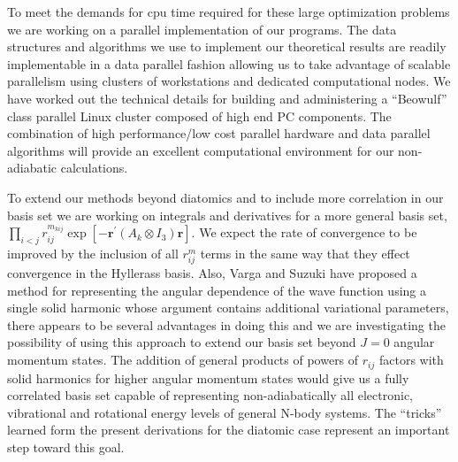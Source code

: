\documentclass[12pt]{article}
\begin{document}
To meet the demands for cpu time required for these large optimization
problems we are working on a parallel implementation of our programs. The data
structures and algorithms we use to implement our theoretical results are
readily implementable in a data parallel fashion allowing us to take advantage
of scalable parallelism using clusters of workstations and dedicated
computational nodes. We have worked out the technical details for building and
administering a ``Beowulf''\cite{beowulfwww} class parallel Linux cluster
composed of high end PC components. The combination of  high performance/low
cost parallel hardware and data parallel algorithms will provide an excellent
computational environment for our non-adiabatic calculations.

To extend our methods beyond diatomics and to include more correlation in our
basis set we are working on integrals and derivatives for a more general basis
set, $\prod_{i<j}r_{ij}^{m_{kij}}\exp\left[  -\mathbf{r}^{\prime}(A_{k}\otimes
I_{3})\mathbf{r}\right]  .$  We expect the rate of convergence to be improved
by the inclusion of all  $r_{ij}^{m}$ terms in the same way that they effect
convergence in the Hyllerass basis. Also, Varga and Suzuki\cite{Varga95} have
proposed a method for representing the angular dependence of the wave function
using a single solid harmonic whose argument contains additional variational
parameters, there appears to be several advantages in doing this and we are
investigating the possibility of using this approach to extend our basis set
beyond $J=0$ angular momentum states. The addition of general products of
powers of $r_{ij}$ factors with solid harmonics for higher angular momentum
states would give us a fully correlated basis set capable of representing
non-adiabatically all electronic, vibrational and rotational energy levels of
general N-body systems. The ``tricks'' learned form the present derivations
for the diatomic case represent an important step toward this goal. 



\end{document}

